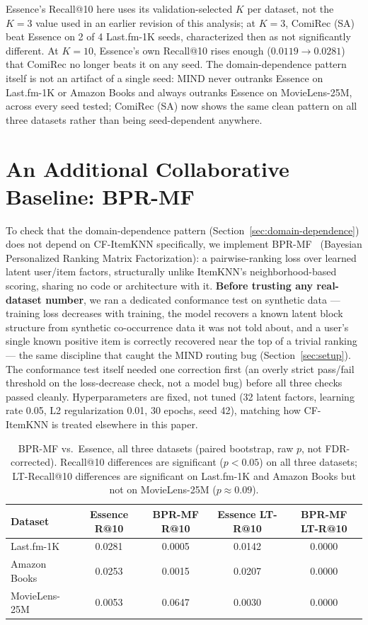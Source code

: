 \documentclass{article}
\begin{document}
Essence's Recall@10 here uses its validation-selected $K$ per dataset, not the $K=3$ value used in an earlier revision of this analysis; at $K=3$, ComiRec (SA) beat Essence on 2 of 4 Last.fm-1K seeds, characterized then as not significantly different. At $K=10$, Essence's own Recall@10 rises enough ($0.0119\to0.0281$) that ComiRec no longer beats it on any seed. The domain-dependence pattern itself is not an artifact of a single seed: MIND never outranks Essence on Last.fm-1K or Amazon Books and always outranks Essence on MovieLens-25M, across every seed tested; ComiRec (SA) now shows the same clean pattern on all three datasets rather than being seed-dependent anywhere.

\section{An Additional Collaborative Baseline: BPR-MF}
\label{app:bprmf}

To check that the domain-dependence pattern (Section~\ref{sec:domain-dependence}) does not depend on CF-ItemKNN specifically, we implement BPR-MF~\cite{rendle2009} (Bayesian Personalized Ranking Matrix Factorization): a pairwise-ranking loss over learned latent user/item factors, structurally unlike ItemKNN's neighborhood-based scoring, sharing no code or architecture with it. \textbf{Before trusting any real-dataset number}, we ran a dedicated conformance test on synthetic data --- training loss decreases with training, the model recovers a known latent block structure from synthetic co-occurrence data it was not told about, and a user's single known positive item is correctly recovered near the top of a trivial ranking --- the same discipline that caught the MIND routing bug (Section~\ref{sec:setup}). The conformance test itself needed one correction first (an overly strict pass/fail threshold on the loss-decrease check, not a model bug) before all three checks passed cleanly. Hyperparameters are fixed, not tuned (32 latent factors, learning rate 0.05, L2 regularization 0.01, 30 epochs, seed 42), matching how CF-ItemKNN is treated elsewhere in this paper.

\begin{table}[H]
\centering
\caption{BPR-MF vs.\ Essence, all three datasets (paired bootstrap, raw $p$, not FDR-corrected). Recall@10 differences are significant ($p<0.05$) on all three datasets; LT-Recall@10 differences are significant on Last.fm-1K and Amazon Books but not on MovieLens-25M ($p\approx0.09$).}
\label{tab:bprmf}
\small
\begin{tabular}{lcccc}
\toprule
\textbf{Dataset} & \textbf{Essence R@10} & \textbf{BPR-MF R@10} & \textbf{Essence LT-R@10} & \textbf{BPR-MF LT-R@10} \\
\midrule
Last.fm-1K & 0.0281 & 0.0005 & 0.0142 & 0.0000 \\
Amazon Books & 0.0253 & 0.0015 & 0.0207 & 0.0000 \\
MovieLens-25M & 0.0053 & 0.0647 & 0.0030 & 0.0000 \\
\bottomrule
\end{tabular}
\end{table}
\end{document}
